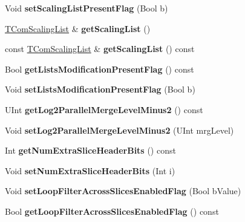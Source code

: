 \begin{DoxyCompactItemize}
Void {\bfseries set\+Scaling\+List\+Present\+Flag} (Bool b)
\item 
\mbox{\label{class_t_com_p_p_s_ac1ffca87ccc4151c269612b40009a9f2}} 
\hyperlink{class_t_com_scaling_list}{T\+Com\+Scaling\+List} \& {\bfseries get\+Scaling\+List} ()
\item 
\mbox{\label{class_t_com_p_p_s_a327bc7b761d36dbf66bd75299b5f2b4e}} 
const \hyperlink{class_t_com_scaling_list}{T\+Com\+Scaling\+List} \& {\bfseries get\+Scaling\+List} () const
\item 
\mbox{\label{class_t_com_p_p_s_a99148ba64fc1f6cb3e3ff84426ffdf3d}} 
Bool {\bfseries get\+Lists\+Modification\+Present\+Flag} () const
\item 
\mbox{\label{class_t_com_p_p_s_ae9a0541813fd4df97486437f03d595d0}} 
Void {\bfseries set\+Lists\+Modification\+Present\+Flag} (Bool b)
\item 
\mbox{\label{class_t_com_p_p_s_abb7e956e28e8b253315659b44f7b9f46}} 
U\+Int {\bfseries get\+Log2\+Parallel\+Merge\+Level\+Minus2} () const
\item 
\mbox{\label{class_t_com_p_p_s_aca23b25d0a7cfc0d6af373431cd2340a}} 
Void {\bfseries set\+Log2\+Parallel\+Merge\+Level\+Minus2} (U\+Int mrg\+Level)
\item 
\mbox{\label{class_t_com_p_p_s_a79441f07af266d091cefde726f4d3d29}} 
Int {\bfseries get\+Num\+Extra\+Slice\+Header\+Bits} () const
\item 
\mbox{\label{class_t_com_p_p_s_abef93e97c3fbc1f70401f9f89193890c}} 
Void {\bfseries set\+Num\+Extra\+Slice\+Header\+Bits} (Int i)
\item 
\mbox{\label{class_t_com_p_p_s_a022abcb31c40c3226e70183db7b91959}} 
Void {\bfseries set\+Loop\+Filter\+Across\+Slices\+Enabled\+Flag} (Bool b\+Value)
\item 
\mbox{\label{class_t_com_p_p_s_a519e5ee9ac84776ea0c20b93bb5530a8}} 
Bool {\bfseries get\+Loop\+Filter\+Across\+Slices\+Enabled\+Flag} () const

\end{DoxyCompactItemize}
